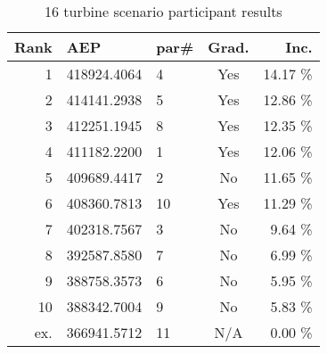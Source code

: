 		\begin{table}[H]
			\begin{center}
				\caption{16 turbine scenario participant results}
				\label{tab:results1}
				\begin{tabular}{r l l c r}
					\hline
					Rank           & AEP         & par\# & Grad. 	& Inc.\\
					\hline
					1              & 418924.4064 & 4     & Yes      & 14.17 \% \\
					2              & 414141.2938 & 5     & Yes      & 12.86 \% \\
					3              & 412251.1945 & 8     & Yes      & 12.35 \% \\
					4              & 411182.2200 & 1     & Yes      & 12.06 \% \\
					5              & 409689.4417 & 2     & No       & 11.65 \% \\
					6              & 408360.7813 & 10    & Yes      & 11.29 \% \\
					7              & 402318.7567 & 3     & No       &  9.64 \%\\
					8              & 392587.8580 & 7     & No       &  6.99 \%\\
					9              & 388758.3573 & 6     & No       &  5.95 \%\\
					10             & 388342.7004 & 9     & No       &  5.83 \%\\
					ex.			   & 366941.5712 & 11    & N/A      &  0.00 \%\\
					\hline
				\end{tabular}
			\end{center}
		\end{table}


